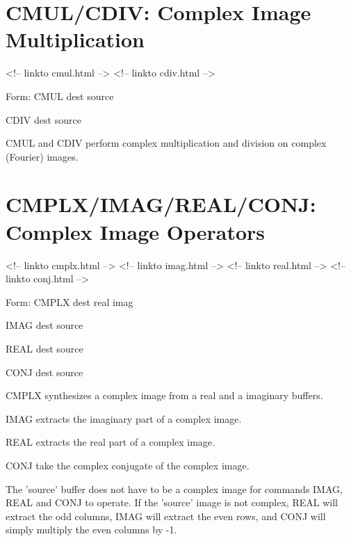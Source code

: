 \section{CMUL/CDIV: Complex Image Multiplication}
\begin{rawhtml}
<!-- linkto cmul.html -->
<!-- linkto cdiv.html -->
\end{rawhtml}
\begin{command}
  \item[Form: CMUL dest source\hfill]{}
  \item[CDIV dest source\hfill]{}
\end{command}

CMUL and CDIV perform complex multiplication and division on complex
(Fourier) images.

\section{CMPLX/IMAG/REAL/CONJ: Complex Image Operators}
\begin{rawhtml}
<!-- linkto cmplx.html -->
<!-- linkto imag.html -->
<!-- linkto real.html -->
<!-- linkto conj.html -->
\end{rawhtml}
\begin{command}
  \item[Form: CMPLX dest real imag\hfill]{}
  \item[IMAG dest source\hfill]{}
  \item[REAL dest source\hfill]{}
  \item[CONJ dest source\hfill]{}
\end{command}

CMPLX synthesizes a complex image from a real and a imaginary buffers.  

IMAG extracts the imaginary part of a complex image.  

REAL extracts the real part of a complex image.  

CONJ take the complex conjugate of the complex image.

The 'source' buffer does not have to be a complex image for commands IMAG,
REAL and CONJ to operate. If the 'source' image is not complex, REAL will
extract the odd columns, IMAG will extract the even rows, and CONJ will
simply multiply the even columns by -1.








